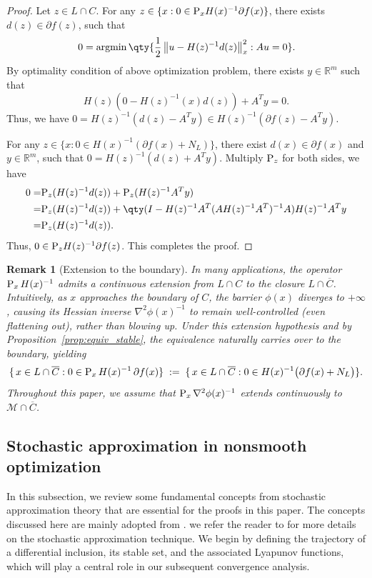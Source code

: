 \documentclass[11pt]{article}
\newcommand{\argmin}{\mathop{\rm argmin}}
\newcommand{\R}{\mathbb R}
\newcommand{\cM}{\mathcal M}
\def\norm#1{\left\|#1\right\|}
\newtheorem{remark}{Remark}[section]
\begin{document}
\begin{proof}
Let \(z\in L\cap C\). For any $z\in\{x:0\in {\rm P}_xH(x)^{-1}\partial f(x)\}$, there exists $d(z)\in\partial f(z)$, such that 
\[
0=\argmin\qty{\frac{1}{2}\norm{u-H(z)^{-1}d(z)}_x^2:Au=0}.
\]
 By optimality condition of above optimization problem, there exists $y\in\R^m$ such that 
\[
H(z)(0-H(z)^{-1}(x)d(z))+A^Ty=0.
\]
Thus, we have $0=H(z)^{-1}(d(z)-A^Ty)\in H(z)^{-1}(\partial f(z)-A^Ty)$. 

For any $z\in\{x:0\in H(x)^{-1}(\partial f(x)+N_L)\}$, there exist $d(x)\in\partial f(x)$ and $y\in\R^m$, such that $0=H(z)^{-1}(d(z)+A^Ty)$. Multiply ${\rm P}_z$ for both sides, we have 
\[
\begin{aligned}
0=&{\rm P}_z(H(z)^{-1}d(z))+{\rm P}_z(H(z)^{-1}A^Ty)\\
=&{\rm P}_z(H(z)^{-1}d(z))+\qty(I-H(z)^{-1}A^T(AH(z)^{-1}A^T)^{-1}A)H(z)^{-1}A^Ty\\
=&{\rm P}_z(H(z)^{-1}d(z)).
\end{aligned}
\]
Thus, $0\in {\rm P}_zH(z)^{-1}\partial f(z)$. This completes the proof.
\end{proof}





\begin{remark}[Extension to the boundary] 
In many applications, the operator ${\rm P}_x\,H(x)^{-1}$ admits a continuous extension from \(L\cap C\) to the closure \(L\cap\overline C\).  Intuitively, as \(x\) approaches the boundary of \(C\), the barrier \(\phi(x)\) diverges to \(+\infty\), causing its Hessian inverse \(\nabla^2\phi(x)^{-1}\) to remain well-controlled (even flattening out), rather than blowing up. Under this extension hypothesis and by Proposition~\ref{prop:equiv_stable}, the equivalence naturally carries over to the boundary, yielding
\[
\{\,x\in L\cap\overline C : 0\in {\rm P}_x\,H(x)^{-1}\,\partial f(x)\}
\;:=\;
\{\,x\in L\cap\overline C : 0\in H(x)^{-1}\bigl(\partial f(x)+N_L\bigr)\}.
\]
Throughout this paper, we assume that \({\rm P}_x\,\nabla^2\phi(x)^{-1}\) extends continuously to \(\cM\cap\overline C\).
\end{remark}


\subsection{Stochastic approximation in nonsmooth optimization}

In this subsection, we review  some fundamental concepts from stochastic approximation theory that are essential for the proofs in this paper.  The concepts discussed here are mainly adopted from \cite{benaim2005stochastic}. we refer the reader to \cite{benaim2006stochastic,borkar2009stochastic,davis2020stochastic} for more details on the stochastic approximation technique.  We begin by defining the trajectory of a differential inclusion, its stable set, and the associated Lyapunov functions, which will play a central role in our subsequent convergence analysis.
\end{document}
